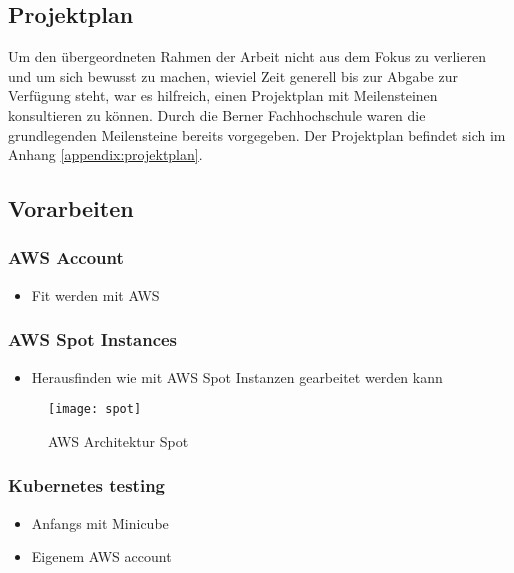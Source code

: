 \subsection{Projektplan}\label{chap:projektplan}
Um den übergeordneten Rahmen der Arbeit nicht aus dem Fokus zu verlieren und um sich bewusst zu machen, wieviel Zeit generell bis zur Abgabe zur Verfügung steht, war es hilfreich, einen Projektplan mit Meilensteinen konsultieren zu können. Durch die Berner Fachhochschule waren die grundlegenden Meilensteine bereits vorgegeben. Der Projektplan befindet sich im Anhang \ref{appendix:projektplan}.

\subsection{Vorarbeiten}
\subsubsection{AWS Account}
\begin{itemize}
	\item Fit werden mit AWS
\end{itemize}

\subsubsection{AWS Spot Instances}
\begin{itemize}
	\item Herausfinden wie mit AWS Spot Instanzen gearbeitet werden kann
\end{itemize}
\begin{figure}[H]
	\centering
	\texttt{[image: spot]}
	\caption{AWS Architektur Spot\cite{AmazonAWSSpot:1}}
	\label{fig:AWS Architektur Spot}
\end{figure}

\subsubsection{Kubernetes testing}
\begin{itemize}
	\item Anfangs mit Minicube
	\item Eigenem AWS account
\end{itemize}
